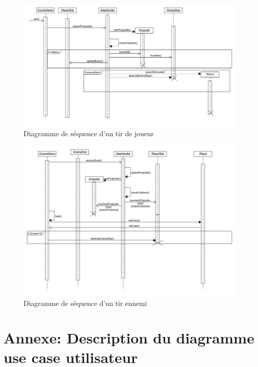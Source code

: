 \documentclass[a4paper,12pt]{article}
\begin{document}
\begin{figure}
\centering
\includegraphics[scale=0.3]{images/player_shooting.jpg}
\caption{Diagramme de séquence d'un tir de joueur}
\end{figure}


\begin{figure}[hbtp]
\centering
\includegraphics[scale=0.3]{images/enemy_shooting.jpg}
\caption{Diagramme de séquence d'un tir ennemi }
\end{figure}

\newpage
\appendix
\section{ Annexe: Description du diagramme use case utilisateur}
\end{document}
